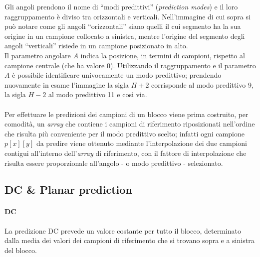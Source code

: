 Gli angoli prendono il nome di ``modi predittivi'' (\emph{prediction modes}) e 
il loro raggruppamento è diviso tra orizzontali e verticali.
Nell'immagine di cui sopra si può notare come gli angoli ``orizzontali'' siano 
quelli il cui segmento ha la sua origine in un campione collocato a sinistra, 
mentre l'origine del segmento degli angoli ``verticali'' risiede in un campione 
posizionato in alto.\\
Il parametro angolare $A$ indica la posizione, in termini di campioni, rispetto 
al campione centrale (che ha valore $0$).
Utilizzando il raggruppamento e il parametro $A$ è possibile identificare 
univocamente un modo predittivo; prendendo nuovamente in esame l'immagine la 
sigla $H+2$ corrisponde al modo predittivo 9, la sigla $H-2$ al modo predittivo 
11 e così via.
\\ \\
Per effettuare le predizioni dei campioni di un blocco viene prima costruito, 
per comodità, un \textit{array} che contiene i campioni di riferimento 
riposizionati nell'ordine che risulta più conveniente per il modo predittivo 
scelto; infatti ogni campione $p[x][y]$ da predire viene ottenuto mediante 
l'interpolazione dei due campioni contigui all'interno dell'\textit{array} di 
riferimento, con il fattore di interpolazione che risulta essere proporzionale 
all'angolo - o modo predittivo - selezionato.

\subsection{DC \& Planar prediction }
\paragraph*{DC} La predizione DC prevede un valore costante per tutto il 
blocco, determinato dalla media dei valori dei campioni di riferimento che si 
trovano sopra e a sinistra del blocco.

